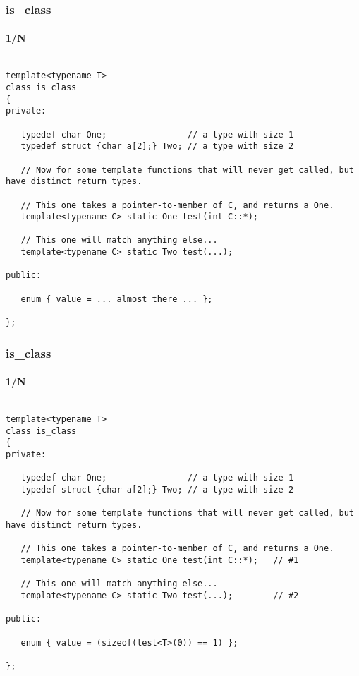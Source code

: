 \begin{frame}[fragile,t]
\frametitle{is\_class}
\framesubtitle{1/N}
{\scriptsize\begin{verbatim}

template<typename T>
class is_class
{
private:

   typedef char One;                // a type with size 1
   typedef struct {char a[2];} Two; // a type with size 2

   // Now for some template functions that will never get called, but have distinct return types.

   // This one takes a pointer-to-member of C, and returns a One.
   template<typename C> static One test(int C::*);

   // This one will match anything else...
   template<typename C> static Two test(...);

public:

   enum { value = ... almost there ... };

};

\end{verbatim}
}

\end{frame}


\begin{frame}[fragile,t]
\frametitle{is\_class}
\framesubtitle{1/N}
{\scriptsize\begin{verbatim}

template<typename T>
class is_class
{
private:

   typedef char One;                // a type with size 1
   typedef struct {char a[2];} Two; // a type with size 2

   // Now for some template functions that will never get called, but have distinct return types.

   // This one takes a pointer-to-member of C, and returns a One.
   template<typename C> static One test(int C::*);   // #1

   // This one will match anything else...
   template<typename C> static Two test(...);        // #2

public:

   enum { value = (sizeof(test<T>(0)) == 1) };

};

\end{verbatim}
}

\end{frame}



